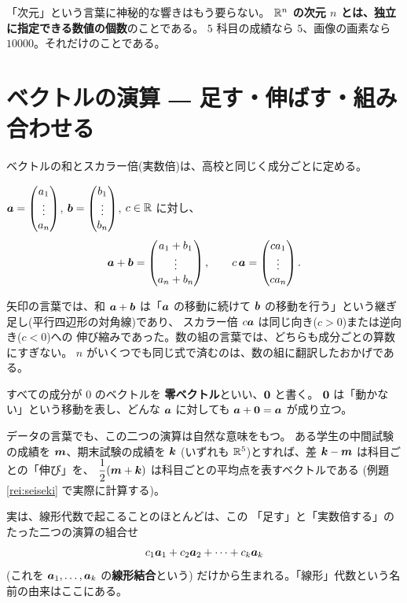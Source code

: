 「次元」という言葉に神秘的な響きはもう要らない。
\textbf{$\mathbb{R}^n$ の次元 $n$ とは、独立に指定できる数値の個数}のことである。
$5$ 科目の成績なら $5$、画像の画素なら $10000$。それだけのことである。

\section{ベクトルの演算 ― 足す・伸ばす・組み合わせる}

ベクトルの和とスカラー倍(実数倍)は、高校と同じく成分ごとに定める。

\begin{teigi}[和とスカラー倍]
$\bm{a} = \begin{pmatrix}a_1 \\ \vdots \\ a_n\end{pmatrix}$,
$\bm{b} = \begin{pmatrix}b_1 \\ \vdots \\ b_n\end{pmatrix}$, $c \in \mathbb{R}$ に対し、
\[
\bm{a} + \bm{b} = \begin{pmatrix}a_1 + b_1 \\ \vdots \\ a_n + b_n\end{pmatrix},
\qquad
c\,\bm{a} = \begin{pmatrix}c a_1 \\ \vdots \\ c a_n\end{pmatrix}.
\]
\end{teigi}

矢印の言葉では、和 $\bm{a} + \bm{b}$ は「$\bm{a}$ の移動に続けて
$\bm{b}$ の移動を行う」という継ぎ足し(平行四辺形の対角線)であり、
スカラー倍 $c\bm{a}$ は同じ向き($c > 0$)または逆向き($c < 0$)への
伸び縮みであった。数の組の言葉では、どちらも成分ごとの算数にすぎない。
$n$ がいくつでも同じ式で済むのは、数の組に翻訳したおかげである。

すべての成分が $0$ のベクトルを \textbf{零ベクトル}といい、$\bm{0}$ と書く。
$\bm{0}$ は「動かない」という移動を表し、どんな $\bm{a}$ に対しても
$\bm{a} + \bm{0} = \bm{a}$ が成り立つ。

データの言葉でも、この二つの演算は自然な意味をもつ。
ある学生の中間試験の成績を $\bm{m}$、期末試験の成績を $\bm{k}$
(いずれも $\mathbb{R}^5$)とすれば、差 $\bm{k} - \bm{m}$ は科目ごとの「伸び」を、
$\dfrac{1}{2}(\bm{m} + \bm{k})$ は科目ごとの平均点を表すベクトルである
(例題 \ref{rei:seiseki} で実際に計算する)。

実は、線形代数で起こることのほとんどは、この
「足す」と「実数倍する」のたった二つの演算の組合せ
\[
c_1 \bm{a}_1 + c_2 \bm{a}_2 + \cdots + c_k \bm{a}_k
\]
(これを $\bm{a}_1, \dots, \bm{a}_k$ の\textbf{線形結合}という)
だけから生まれる。「線形」代数という名前の由来はここにある。

